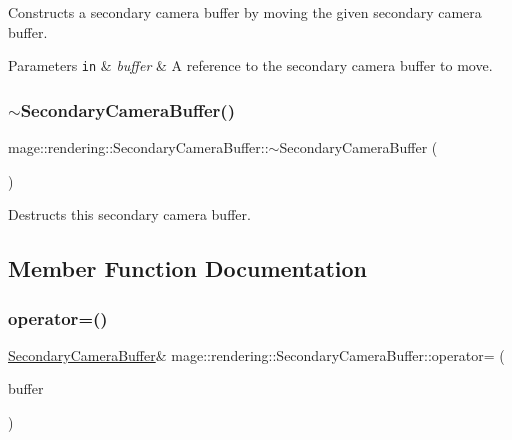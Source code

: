 Constructs a secondary camera buffer by moving the given secondary camera buffer.


\begin{DoxyParams}[1]{Parameters}
\mbox{\tt in}  & {\em buffer} & A reference to the secondary camera buffer to move. \\
\hline
\end{DoxyParams}
\mbox{\label{structmage_1_1rendering_1_1_secondary_camera_buffer_a0ee38cfcaf0cb5961ffc1c37fcb71b3f}} 
\subsubsection{\texorpdfstring{$\sim$\+Secondary\+Camera\+Buffer()}{~SecondaryCameraBuffer()}}
{\footnotesize\ttfamily mage\+::rendering\+::\+Secondary\+Camera\+Buffer\+::$\sim$\+Secondary\+Camera\+Buffer (\begin{DoxyParamCaption}{ }\end{DoxyParamCaption})\hspace{0.3cm}{\ttfamily [default]}}

Destructs this secondary camera buffer. 

\subsection{Member Function Documentation}
\mbox{\label{structmage_1_1rendering_1_1_secondary_camera_buffer_ad26ba75c577c29c131aeab66a22444bd}} 
\subsubsection{\texorpdfstring{operator=()}{operator=()}\hspace{0.1cm}{\footnotesize\ttfamily [1/2]}}
{\footnotesize\ttfamily \mbox{\hyperlink{structmage_1_1rendering_1_1_secondary_camera_buffer}{Secondary\+Camera\+Buffer}}\& mage\+::rendering\+::\+Secondary\+Camera\+Buffer\+::operator= (\begin{DoxyParamCaption}\item[{const \mbox{\hyperlink{structmage_1_1rendering_1_1_secondary_camera_buffer}{Secondary\+Camera\+Buffer}} \&}]{buffer }\end{DoxyParamCaption})\hspace{0.3cm}{\ttfamily [default]}}

